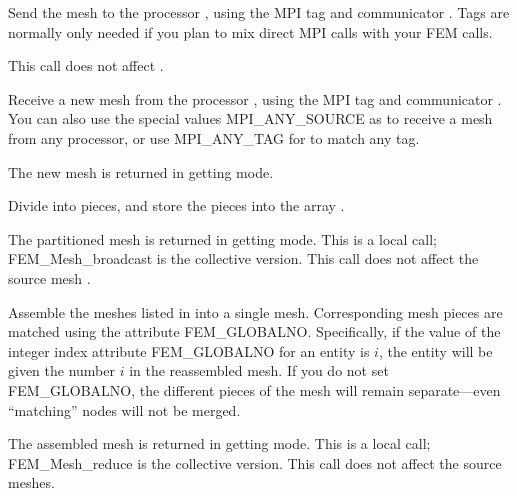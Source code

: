   Send the mesh  to the processor , using
  the MPI tag  and communicator .
  Tags are normally only needed if you plan to mix direct MPI
  calls with your FEM calls.
  
  This call does not affect .
  

  
  Receive a new mesh from the processor , using
  the MPI tag  and communicator .
  You can also use the special values MPI\_ANY\_SOURCE as 
  to receive a mesh from any processor, or use
  MPI\_ANY\_TAG for  to match any tag.

  The new mesh is returned in getting mode.


Divide  into  pieces, and store the pieces
into the array . 

The partitioned mesh is returned in getting mode.
This is a local call; FEM\_Mesh\_broadcast is the collective version.
This call does not affect the source mesh .

  

Assemble the  meshes listed in  into
a single mesh.  Corresponding mesh pieces are matched using 
the attribute FEM\_GLOBALNO.  Specifically, if the value of 
the integer index attribute FEM\_GLOBALNO for an entity is $i$,
the entity will be given the number $i$ in the reassembled mesh.
If you do not set FEM\_GLOBALNO, the different pieces of the 
mesh will remain separate---even ``matching'' nodes will not be merged.

The assembled mesh is returned in getting mode.
This is a local call; FEM\_Mesh\_reduce is the collective version.
This call does not affect the source meshes.


